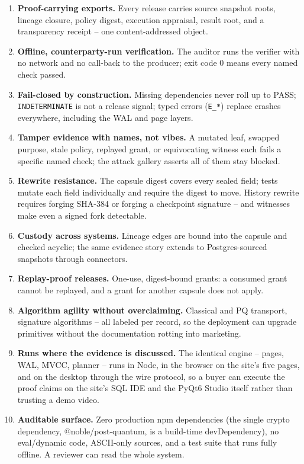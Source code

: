 \documentclass[11pt]{article}
\newcommand{\code}[1]{\texttt{#1}}
\begin{document}
\begin{enumerate}
  \item \textbf{Proof-carrying exports.} Every release carries source
    snapshot roots, lineage closure, policy digest, execution appraisal,
    result root, and a transparency receipt -- one content-addressed object.
  \item \textbf{Offline, counterparty-run verification.} The auditor runs
    the verifier with no network and no call-back to the producer; exit
    code 0 means every named check passed.
  \item \textbf{Fail-closed by construction.} Missing dependencies never
    roll up to PASS; \code{INDETERMINATE} is not a release signal; typed
    errors (\code{E\_*}) replace crashes everywhere, including the WAL and
    page layers.
  \item \textbf{Tamper evidence with names, not vibes.} A mutated leaf,
    swapped purpose, stale policy, replayed grant, or equivocating witness
    each fails a specific named check; the attack gallery asserts all of
    them stay blocked.
  \item \textbf{Rewrite resistance.} The capsule digest covers every sealed
    field; tests mutate each field individually and require the digest to
    move. History rewrite requires forging SHA-384 or forging a checkpoint
    signature -- and witnesses make even a signed fork detectable.
  \item \textbf{Custody across systems.} Lineage edges are bound into the
    capsule and checked acyclic; the same evidence story extends to
    Postgres-sourced snapshots through connectors.
  \item \textbf{Replay-proof releases.} One-use, digest-bound grants: a
    consumed grant cannot be replayed, and a grant for another capsule
    does not apply.
  \item \textbf{Algorithm agility without overclaiming.} Classical and PQ
    transport, signature algorithms -- all labeled per record, so the
    deployment can upgrade primitives without the documentation rotting
    into marketing.
  \item \textbf{Runs where the evidence is discussed.} The identical
    engine -- pages, WAL, MVCC, planner -- runs in Node, in the browser on the
    site's five pages, and on the desktop through the wire protocol, so a buyer can execute the proof claims on the
    site's SQL IDE and the PyQt6 Studio itself rather than trusting a demo video.
  \item \textbf{Auditable surface.} Zero production npm dependencies (the
    single crypto dependency, @noble/post-quantum, is a build-time
    devDependency), no eval/dynamic code, ASCII-only sources, and a
    test suite that runs fully offline. A reviewer can read the whole
    system.
\end{enumerate}
\end{document}
